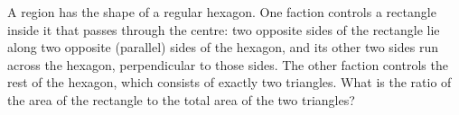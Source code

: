 A region has the shape of a regular hexagon. One faction controls a rectangle inside it that passes through the centre: two opposite sides of the rectangle lie along two opposite (parallel) sides of the hexagon, and its other two sides run across the hexagon, perpendicular to those sides. The other faction controls the rest of the hexagon, which consists of exactly two triangles. What is the ratio of the area of the rectangle to the total area of the two triangles?
